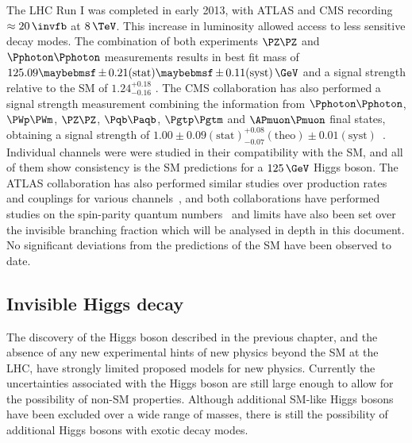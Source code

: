 The \gls{LHC} Run I was completed in early 2013, with ATLAS and \gls{CMS} recording $\approx20\,\invfb$ at $8\,\TeV$. This increase in luminosity allowed access to less sensitive decay modes. The combination of both experiments $\PZ\PZ$ and $\Pphoton\Pphoton$ measurements results in best fit mass of $125.09 \pm 0.21(\text{stat}) \pm 0.11(\text{syst})\,\GeV$ and a signal strength relative to the \gls{SM} of $1.24^{+0.18}_{-0.16}$ \cite{ARTICLE:CombinedMeasurementOfTheHiggsBoson}. The \gls{CMS} collaboration has also performed a signal strength measurement combining the information from $\Pphoton\Pphoton$, $\PWp\PWm$, $\PZ\PZ$, $\Pqb\Paqb$, $\Pgtp\Pgtm$ and $\APmuon\Pmuon$ final states, obtaining a signal strength of $1.00\pm0.09(\text{stat})^{+0.08}_{-0.07}(\text{theo})\pm0.01(\text{syst})$~\cite{ARTICLE:CMScomb}. Individual channels were were studied in their compatibility with the \gls{SM}, and all of them show consistency is the \gls{SM} predictions for a $125\,\GeV$ Higgs boson. The ATLAS collaboration has also performed similar studies over production rates and couplings for various channels~\cite{Aad:2014eva,Aad:2014lwa,Aad:2015vsa}, and both collaborations have performed studies on the spin-parity quantum numbers~\cite{Chatrchyan:2013mxa,Chatrchyan:2013iaa,Aad:2013xqa} and limits have also been set over the invisible branching fraction which will be analysed in depth in this document. No significant deviations from the predictions of the \gls{SM} have been observed to date.

\subsection{Invisible Higgs decay}
\label{SUBSECTION:Theory_SM_InvisibleHiggsDecay}


The discovery of the Higgs boson described in the previous chapter, and the absence of any new experimental hints of new physics beyond the \gls{SM} at the \gls{LHC}, have strongly limited proposed models for new physics. Currently the uncertainties associated with the Higgs boson are still large enough to allow for the possibility of non-\gls{SM} properties. Although additional \gls{SM}-like Higgs bosons have been excluded over a wide range of masses, there is still the possibility of additional Higgs bosons with exotic decay modes.

